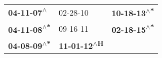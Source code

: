 \begin{supertabular}{lll}
  \textbf{04-11-07\textsuperscript{$\wedge$}} &                    02-28-10\textsuperscript{} &  \textbf{10-18-13\textsuperscript{$\wedge$*}} \\
 \textbf{04-11-08\textsuperscript{$\wedge$*}} &                    09-16-11\textsuperscript{} &  \textbf{02-18-15\textsuperscript{$\wedge$*}} \\
 \textbf{04-08-09\textsuperscript{$\wedge$*}} &  \textbf{11-01-12\textsuperscript{$\wedge$H}} &                                               \\
\end{supertabular}
